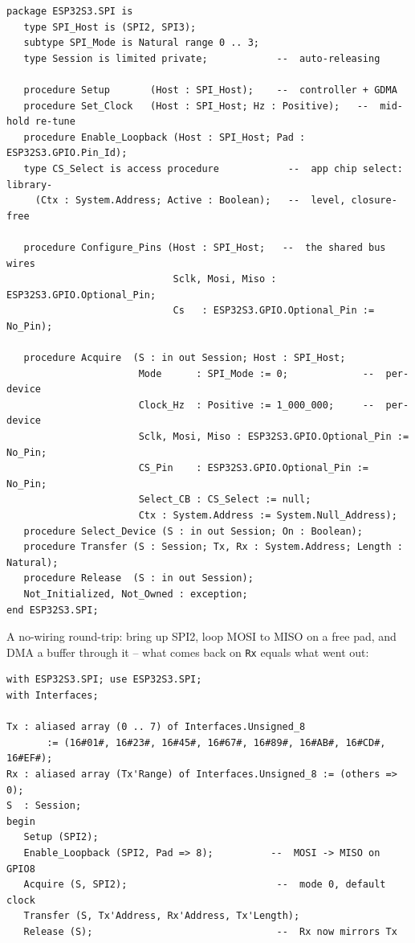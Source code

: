 \begin{lstlisting}
package ESP32S3.SPI is
   type SPI_Host is (SPI2, SPI3);
   subtype SPI_Mode is Natural range 0 .. 3;
   type Session is limited private;            --  auto-releasing

   procedure Setup       (Host : SPI_Host);    --  controller + GDMA
   procedure Set_Clock   (Host : SPI_Host; Hz : Positive);   --  mid-hold re-tune
   procedure Enable_Loopback (Host : SPI_Host; Pad : ESP32S3.GPIO.Pin_Id);
   type CS_Select is access procedure            --  app chip select: library-
     (Ctx : System.Address; Active : Boolean);   --  level, closure-free

   procedure Configure_Pins (Host : SPI_Host;   --  the shared bus wires
                             Sclk, Mosi, Miso : ESP32S3.GPIO.Optional_Pin;
                             Cs   : ESP32S3.GPIO.Optional_Pin := No_Pin);

   procedure Acquire  (S : in out Session; Host : SPI_Host;
                       Mode      : SPI_Mode := 0;             --  per-device
                       Clock_Hz  : Positive := 1_000_000;     --  per-device
                       Sclk, Mosi, Miso : ESP32S3.GPIO.Optional_Pin := No_Pin;
                       CS_Pin    : ESP32S3.GPIO.Optional_Pin := No_Pin;
                       Select_CB : CS_Select := null;
                       Ctx : System.Address := System.Null_Address);
   procedure Select_Device (S : in out Session; On : Boolean);
   procedure Transfer (S : Session; Tx, Rx : System.Address; Length : Natural);
   procedure Release  (S : in out Session);
   Not_Initialized, Not_Owned : exception;
end ESP32S3.SPI;
\end{lstlisting}

A no-wiring round-trip: bring up SPI2, loop MOSI to MISO on a free pad, and DMA
a buffer through it -- what comes back on \texttt{Rx} equals what went out:

\begin{lstlisting}
with ESP32S3.SPI; use ESP32S3.SPI;
with Interfaces;

Tx : aliased array (0 .. 7) of Interfaces.Unsigned_8
       := (16#01#, 16#23#, 16#45#, 16#67#, 16#89#, 16#AB#, 16#CD#, 16#EF#);
Rx : aliased array (Tx'Range) of Interfaces.Unsigned_8 := (others => 0);
S  : Session;
begin
   Setup (SPI2);
   Enable_Loopback (SPI2, Pad => 8);          --  MOSI -> MISO on GPIO8
   Acquire (S, SPI2);                          --  mode 0, default clock
   Transfer (S, Tx'Address, Rx'Address, Tx'Length);
   Release (S);                                --  Rx now mirrors Tx
\end{lstlisting}

